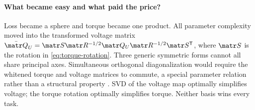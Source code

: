 

\paragraph{What became easy and what paid the price?}
Loss became a sphere and torque became one product. All parameter complexity
moved into the transformed voltage matrix
\(\bar{\matr Q}_U=\matr S\matr R^{-1/2}\matr Q_U\matr R^{-1/2}\matr S^{\mathsf T}\),
where \(\matr S\) is the rotation in \cref{eq:torque-rotation}. Three generic
symmetric forms cannot all share principal axes. Simultaneous orthogonal
diagonalization would require the whitened torque and voltage matrices to
commute, a special parameter relation rather than a structural property
\cite{horn2013}. SVD of the voltage map optimally simplifies voltage; the
torque rotation optimally simplifies torque. Neither basis wins every task.
